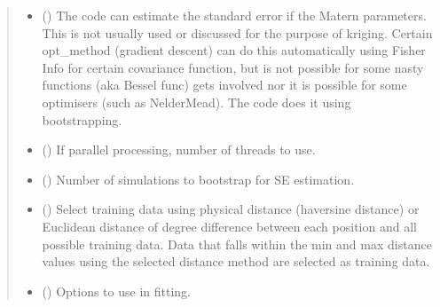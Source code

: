 \documentclass[letterpaper,10pt,english]{sphinxmanual}
\begin{document}
\begin{fulllineitems}
\begin{fulllineitems}
\begin{quote}
\begin{description}
\begin{itemize}
\sphinxAtStartPar
Note on new tol kwarg:
For N\sphinxhyphen{}M, this sets the value to both xatol and fatol
Default is 1E\sphinxhyphen{}3 (?)
Since it affects accuracy of all values including rotation
rotation angle 0.001 rad \textasciitilde{} 0.05 deg


\item {}
\sphinxAtStartPar
{} (\sphinxstyleliteralemphasis{\sphinxupquote{ | }}) \textendash{} The code can estimate the standard error if the Matern parameters.
This is not usually used or discussed for the purpose of kriging.
Certain opt\_method (gradient descent) can do this automatically
using Fisher Info for certain covariance function,
but is not possible for some nasty functions (aka Bessel
func) gets involved nor it is possible for some optimisers
(such as Nelder\sphinxhyphen{}Mead).
The code does it using bootstrapping.

\item {}
\sphinxAtStartPar
{} () \textendash{} If parallel processing, number of threads to use.

\item {}
\sphinxAtStartPar
{} () \textendash{} Number of simulations to bootstrap for SE estimation.

\item {}
\sphinxAtStartPar
{} () \textendash{} Select training data using physical distance (haversine distance) or
Euclidean distance of degree difference between each position and
all possible training data. Data that falls within the min and max
distance values using the selected distance method are selected as
training data.

\item {}
\sphinxAtStartPar
{} () \textendash{} Options to use in fitting.

\end{itemize}


\end{description}
\end{quote}
\end{fulllineitems}
\end{fulllineitems}
\end{document}
